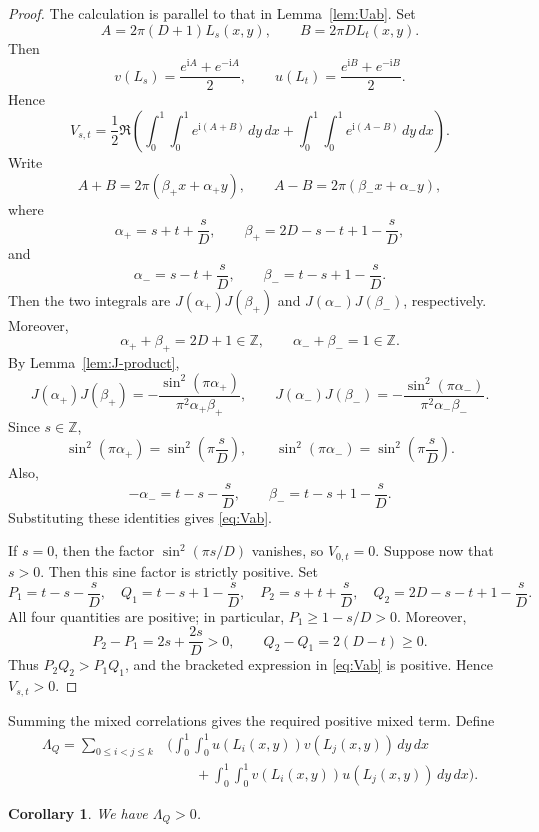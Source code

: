 \documentclass[twoside,12pt]{article}
\newcommand{\Z}{\mathbb{Z}}
\newcommand{\1}{\mathbf 1}
\newtheorem{corollary}[theorem]{Corollary}
\begin{document}
\begin{proof}
The calculation is parallel to that in Lemma~\ref{lem:Uab}.  Set
\[
A=2\pi(D+1)L_s(x,y),
\qquad
B=2\pi D L_t(x,y).
\]
Then
\[
v(L_s)=\frac{e^{\mathrm iA}+e^{-\mathrm iA}}2,
\qquad
u(L_t)=\frac{e^{\mathrm iB}+e^{-\mathrm iB}}2.
\]
Hence
\[
V_{s,t}
=
\frac12\Re\left(
\int_0^1\!\int_0^1 e^{\mathrm i(A+B)}\,dy\,dx
+
\int_0^1\!\int_0^1 e^{\mathrm i(A-B)}\,dy\,dx
\right).
\]
Write
\[
A+B=2\pi(\beta_+x+\alpha_+y),
\qquad
A-B=2\pi(\beta_-x+\alpha_-y),
\]
where
\[
\alpha_+=s+t+\frac sD,
\qquad
\beta_+=2D-s-t+1-\frac sD,
\]
and
\[
\alpha_-=s-t+\frac sD,
\qquad
\beta_-=t-s+1-\frac sD.
\]
Then the two integrals are \(J(\alpha_+)J(\beta_+)\) and
\(J(\alpha_-)J(\beta_-)\), respectively.  Moreover,
\[
\alpha_++\beta_+=2D+1\in\Z,
\qquad
\alpha_-+\beta_-=1\in\Z.
\]
By Lemma~\ref{lem:J-product},
\[
J(\alpha_+)J(\beta_+)
=
-\frac{\sin^2(\pi\alpha_+)}{\pi^2\alpha_+\beta_+},
\qquad
J(\alpha_-)J(\beta_-)
=
-\frac{\sin^2(\pi\alpha_-)}{\pi^2\alpha_-\beta_-}.
\]
Since \(s\in\Z\),
\[
\sin^2(\pi\alpha_+)=\sin^2\left(\pi\frac sD\right),
\qquad
\sin^2(\pi\alpha_-)=\sin^2\left(\pi\frac sD\right).
\]
Also,
\[
-\alpha_-=t-s-\frac sD,
\qquad
\beta_-=t-s+1-\frac sD.
\]
Substituting these identities gives \eqref{eq:Vab}.

If \(s=0\), then the factor \(\sin^2(\pi s/D)\) vanishes, so
\(V_{0,t}=0\).  Suppose now that \(s>0\).  Then this sine factor is strictly
positive.  Set
\[
P_1=t-s-\frac sD,
\quad
Q_1=t-s+1-\frac sD,
\quad
P_2=s+t+\frac sD,
\quad
Q_2=2D-s-t+1-\frac sD.
\]
All four quantities are positive; in particular, \(P_1\ge 1-s/D>0\).  Moreover,
\[
P_2-P_1=2s+\frac{2s}{D}>0,
\qquad
Q_2-Q_1=2(D-t)\ge0.
\]
Thus \(P_2Q_2>P_1Q_1\), and the bracketed expression in \eqref{eq:Vab} is
positive.  Hence \(V_{s,t}>0\).
\end{proof}

Summing the mixed correlations gives the required positive mixed term.  Define
\begin{equation}\label{eq:Lambda}
\begin{aligned}
\Lambda_Q
=
\sum_{0\le i<j\le k}
&\Biggl(
\int_0^1\!\int_0^1 u(L_i(x,y))v(L_j(x,y))\,dy\,dx \\
&\qquad
+
\int_0^1\!\int_0^1 v(L_i(x,y))u(L_j(x,y))\,dy\,dx
\Biggr).
\end{aligned}
\end{equation}

\begin{corollary}\label{cor:Lambda-positive}
We have \(\Lambda_Q>0\).
\end{corollary}
\end{document}
